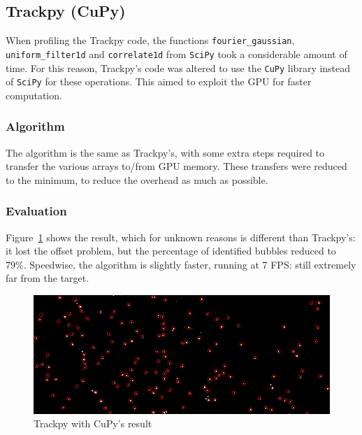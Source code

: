 \subsection{Trackpy (CuPy)}

When profiling the Trackpy code, the functions \texttt{fourier\_gaussian}, \texttt{uniform\_filter1d} and \texttt{correlate1d} from \texttt{SciPy} took a considerable amount of time.
For this reason, Trackpy's code was altered to use the \texttt{CuPy} library instead of \texttt{SciPy} for these operations.
This aimed to exploit the GPU for faster computation.

\subsubsection{Algorithm}

The algorithm is the same as Trackpy's, with some extra steps required to transfer the various arrays to/from GPU memory.
These transfers were reduced to the minimum, to reduce the overhead as much as possible.

\subsubsection{Evaluation}

Figure~\ref{fig:locate:trackpy-cupy} shows the result, which for unknown reasons is different than Trackpy's: it lost the offset problem, but the percentage of identified bubbles reduced to 79\%.
Speedwise, the algorithm is slightly faster, running at 7 FPS: still extremely far from the target.

\begin{figure}
	\centerline{\includegraphics[width=\locateimgsize]{images/locate/cuda-trackpy.png}}
	\caption{\centering Trackpy with CuPy's result}
	\label{fig:locate:trackpy-cupy}
\end{figure}
